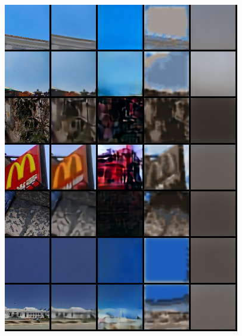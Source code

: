 \begin{appendices}
\begin{figure}
    \includegraphics[width=0.92\textwidth]{figures/ptz/train_stacked_2}
\end{figure}
\begin{figure}
    \centering

\end{figure}
\end{appendices}
